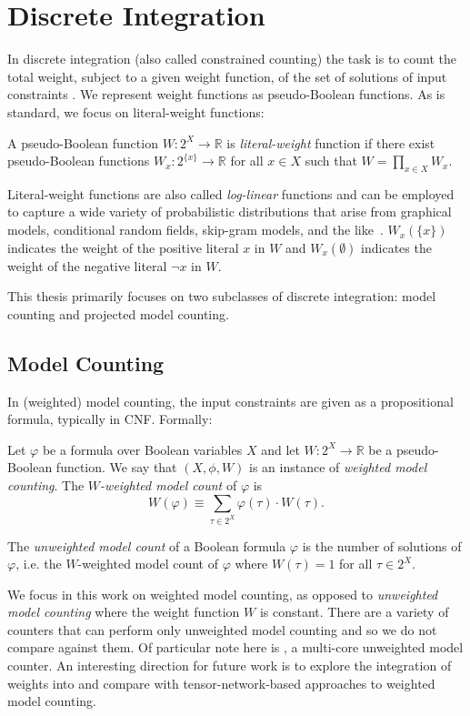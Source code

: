 \section{Discrete Integration}
\label{sec:wmc}

In discrete integration (also called constrained counting) the task is to count the total weight, subject to a given weight function, of the set of solutions of input constraints \cite{GSS08}. We represent weight functions as pseudo-Boolean functions. As is standard, we focus on literal-weight functions: 
\begin{definition}
A pseudo-Boolean function $W: 2^X \rightarrow \mathbb{R}$ is \emph{literal-weight} function if there exist pseudo-Boolean functions $W_x: 2^{\{x\}} \rightarrow \mathbb{R}$ for all $x \in X$ such that $W = \prod_{x \in X} W_x$. 
\end{definition}
Literal-weight functions are also called \emph{log-linear} functions and can be employed to capture a wide variety of probabilistic distributions that arise from graphical models, conditional random fields, skip-gram models, and the like~\cite{KF09}.
$W_x(\{x\})$ indicates the weight of the positive literal $x$ in $W$ and $W_x(\emptyset)$ indicates the weight of the negative literal $\neg x$ in $W$.

This thesis primarily focuses on two subclasses of discrete integration: model counting and projected model counting.

\subsection{Model Counting}
In (weighted) model counting, the input constraints are given as a propositional formula, typically in CNF. Formally:
\begin{definition}
  Let $\varphi$ be a formula over Boolean variables $X$ and let $W: 2^X \rightarrow \mathbb{R}$ be a pseudo-Boolean function. We say that $(X, \phi, W)$ is an instance of \emph{weighted model counting}. The \emph{$W$-weighted model count} of $\varphi$ is
  $$W(\varphi) \equiv \sum_{\tau \in 2^X} \varphi(\tau) \cdot W(\tau).$$
\end{definition}

The \emph{unweighted model count} of a Boolean formula $\varphi$ is the number of solutions of $\varphi$, i.e. the $W$-weighted model count of $\varphi$ where $W(\tau) = 1$ for all $\tau \in 2^X$.


We focus in this work on weighted model counting, as opposed to \emph{unweighted model counting} where the weight function $W$ is constant. There are a variety of counters \cite{CW16,FHMW17,Thurley2006} that can perform only unweighted model counting and so we do not compare against them. Of particular note here is  \cite{BSB15}, a multi-core unweighted model counter. An interesting direction for future work is to explore the integration of weights into  and compare with tensor-network-based approaches to weighted model counting.

